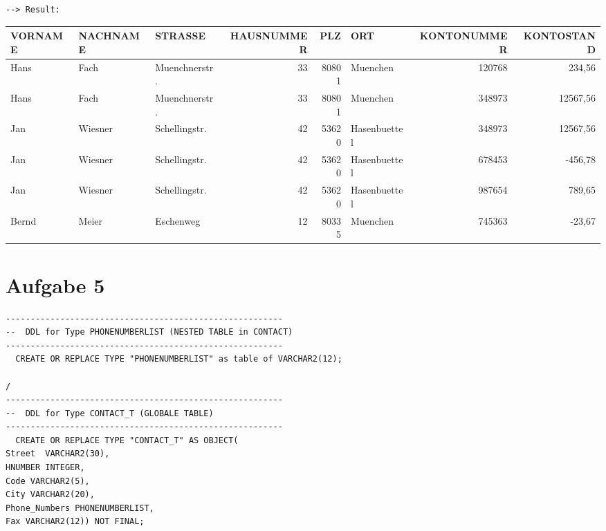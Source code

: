 \documentclass{scrartcl}
\begin{document}
\begin{landscape}
\begin{lstlisting}
--> Result:
\end{lstlisting}
\begin{tabular}{ l l l r r l r r }
VORNAME      &        NACHNAME     &        STRASSE                &        HAUSNUMMER    &    PLZ & ORT          &        KONTONUMMER & KONTOSTAND \\
\hline
Hans        &         Fach        &         Muenchnerstr.             &              33   &   80801 & Muenchen   &                120768  &   234,56 \\
Hans       &          Fach      &           Muenchnerstr.       &                    33    &  80801  & Muenchen      &             348973 &   12567,56 \\
Jan          &        Wiesner       &       Schellingstr.            &              42    &  53620 & Hasenbuettel    &           348973  & 12567,56 \\
Jan        &          Wiesner    &          Schellingstr.   &                       42  &    53620 & Hasenbuettel   &            678453  &  -456,78 \\
Jan           &       Wiesner      &        Schellingstr.      &                    42   &   53620 & Hasenbuettel       &        987654  &   789,65 \\
Bernd      &          Meier     &           Eschenweg   &                           12    &  80335 & Muenchen              &     745363   &  -23,67 \\
\end{tabular}

\end{landscape}

\section*{Aufgabe 5}
\begin{lstlisting}
--------------------------------------------------------
--  DDL for Type PHONENUMBERLIST (NESTED TABLE in CONTACT)
--------------------------------------------------------
  CREATE OR REPLACE TYPE "PHONENUMBERLIST" as table of VARCHAR2(12);

/
--------------------------------------------------------
--  DDL for Type CONTACT_T (GLOBALE TABLE)
--------------------------------------------------------
  CREATE OR REPLACE TYPE "CONTACT_T" AS OBJECT(
Street  VARCHAR2(30),
HNUMBER INTEGER,
Code VARCHAR2(5),
City VARCHAR2(20),
Phone_Numbers PHONENUMBERLIST,
Fax VARCHAR2(12)) NOT FINAL;
\end{lstlisting}
\end{document}
